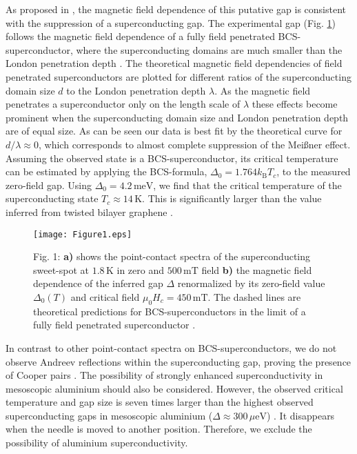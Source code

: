 \documentclass[aps,prb,reprint,twocolumn,showpacs]{revtex4-1}
\begin{document}
As proposed in \cite{Arnold15Thesis}, the magnetic field dependence of this putative gap is consistent with the suppression of a superconducting gap. The experimental gap (Fig. \ref{fig:Figure1}) follows the magnetic field dependence of a fully field penetrated BCS-superconductor, where the superconducting domains are much smaller than the London penetration depth \cite{Douglass61,Meservey64,London48}. The theoretical magnetic field dependencies of field penetrated superconductors are plotted for different ratios of the superconducting domain size $d$ to the London penetration depth $\lambda$. As the magnetic field penetrates a superconductor only on the length scale of $\lambda$ these effects become prominent when the superconducting domain size and London penetration depth are of equal size. As can be seen our data is best fit by the theoretical curve for $d/\lambda\approx0$, which corresponds to almost complete suppression of the Mei\ss ner effect. Assuming the observed state is a BCS-superconductor, its critical temperature can be estimated by applying the BCS-formula, $\Delta_0=1.764k_\mathrm{B}T_c$, to the measured zero-field gap. Using $\Delta_0 = 4.2\,\mathrm{meV}$, we find that the critical temperature of the superconducting state $T_c \approx 14\,\mathrm{K}$. This is significantly larger than the value inferred from twisted bilayer graphene \cite{Cao18_26160}.

\begin{figure}[tb]
	\centering
		\texttt{[image: Figure1.eps]}
	\caption{Fig. 1: {\bf a)} shows the point-contact spectra of the superconducting sweet-spot at $1.8\,\mathrm{K}$ in zero and $500\,\mathrm{mT}$ field {\bf b)} the magnetic field dependence of the inferred gap $\Delta$ renormalized by its zero-field value $\Delta_0(T)$ and critical field $\mu_0H_c=450\,\mathrm{mT}$. The dashed lines are theoretical predictions for BCS-superconductors in the limit of a fully field penetrated superconductor \cite{Douglass61,Meservey64}.}
	\label{fig:Figure1}
\end{figure}

In contrast to other point-contact spectra on BCS-superconductors, we do not observe Andreev reflections within the superconducting gap, proving the presence of Cooper pairs \cite{Andreev64}. The possibility of strongly enhanced superconductivity in mesoscopic aluminium should also be considered. However, the observed critical temperature and gap size is seven times larger than the highest observed superconducting gaps in mesoscopic aluminium ($\Delta\approx300\,\mu\mathrm{eV}$) \cite{Cohen68,Black96,Court08}. It disappears when the needle is moved to another position. Therefore, we exclude the possibility of aluminium superconductivity.
\end{document}

